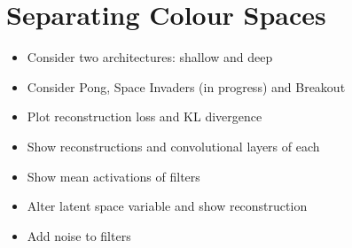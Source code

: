 %
%
%
%
%
\section{Separating Colour Spaces}
\begin{itemize}
\item Consider two architectures: shallow and deep
\item Consider Pong, Space Invaders (in progress) and Breakout
\item Plot reconstruction loss and KL divergence
\item Show reconstructions and convolutional layers of each
\item Show mean activations of filters
\item Alter latent space variable and show reconstruction
\item Add noise to filters
\end{itemize}





